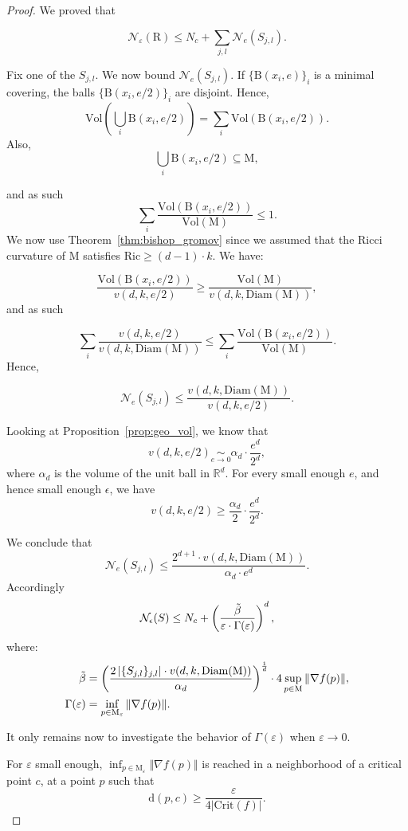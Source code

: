 \documentclass[pdflatex,sn-mathphys-ay]{sn-jnl}%
\newcommand{\reeb}{\mathrm{R}}
\newcommand{\man}{\mathrm{M}}
\newcommand{\dis}{\mathrm{d}}
\newcommand{\critic}{{\mathrm {Crit}}}
\newcommand{\ball}{{\mathrm {B}}}
\newcommand{\diam}{\mathrm{Diam}}
\newcommand{\covn}{\mathcal{N}}
\newcommand{\vol}{\mathrm{Vol}}
\newcommand{\ricci}{\mathrm{Ric}}
\newcommand{\eps}{\varepsilon}
\theoremstyle{thmstyleone}%
\begin{document}
\begin{proof}
We proved that

$$\covn_\eps\left(\reeb\right)\leq N_c+\sum_{j,l}\covn_e\left(S_{j,l}\right).$$
 
 Fix one of the $S_{j,l}$. We now bound $\covn_e\left(S_{j,l}\right)$. If $\{\ball(x_i,e)\}_i$ is a minimal covering, the balls $\{\ball(x_i,e/2)\}_i$ are disjoint. Hence, %
 $$\vol\left(\bigcup_{i}\ball(x_i,e/2)\right)=\sum_{i}\vol\left(\ball(x_i,e/2)\right).$$
Also, %
$$\bigcup_{i}\ball(x_i,e/2)\subseteq \man,$$

and as such
$$\sum_{i}\frac{\vol\left(\ball(x_i,e/2)\right)}{\vol\left(\man\right)}\leq 1.$$
We now use Theorem~\ref{thm:bishop_gromov} since we assumed that the Ricci curvature of $\man$ satisfies $\ricci\geq(d-1)\cdot k$. We have:

$$\frac{\vol\left(\ball(x_i,e/2)\right)}{v(d,k,e/2)}\geq\frac{\vol\left(\man\right)}{v(d,k,\diam(\man))},$$
and as such

$$\sum_i \frac{v(d,k,e/2)}{v(d,k,\diam(\man))}\leq\sum_{i}\frac{\vol\left(\ball(x_i,e/2)\right)}{\vol\left(\man\right)}.$$
Hence,

$$\covn_e\left(S_{j,l}\right)\leq\frac{v(d,k,\diam(\man))}{v(d,k,e/2)}.$$

Looking at Proposition~\ref{prop:geo_vol}, we know that 
$$v(d,k,e/2)\underset{e\rightarrow0}{\sim}\alpha_d\cdot\frac{e^d}{2^d},$$
where $\alpha_d$ is the volume of the unit ball in $\mathbb{R}^d$.
For every small enough $e$, and hence small enough $\epsilon$, we have
$$v(d,k,e/2)\geq \frac{\alpha_d}{2}\cdot \frac{e^d}{2^d}.$$

We conclude that
$$\covn_e\left(S_{j,l}\right)\leq \frac{2^{d+1}\cdot v(d,k,\diam(\man))}{\alpha_d\cdot e^d}.$$
Accordingly
$$\covn_\epsilon(S)\leq N_c+\left(\frac{\Tilde{\beta}}{\eps\cdot\Gamma(\eps)}\right)^d,$$
where:
\begin{align*}
    \Tilde{\beta}&=\left(\frac{2\left|\{S_{j,l}\}_{j,l}\right|\cdot v(d,k,\diam(\man))}{\alpha_d}\right)^{\frac{1}{d}}\cdot4\sup_{p\in\man}\Vert\nabla f(p)\Vert,\\
    \Gamma(\eps)&=\inf_{p\in\man_\eps}\Vert\nabla f(p)\Vert.
\end{align*}


It only remains now to investigate the behavior of $\Gamma(\eps)$ when $\eps\rightarrow 0$.

For $\eps$ small enough, $\inf_{p\in\man_\eps}\Vert\nabla f(p)\Vert$ is reached in a neighborhood of a critical point $c$, at a point $p$ such that
$$\dis(p,c)\geq\frac{\eps}{4\left|\critic(f)\right|}.$$


\end{proof}
\end{document}
